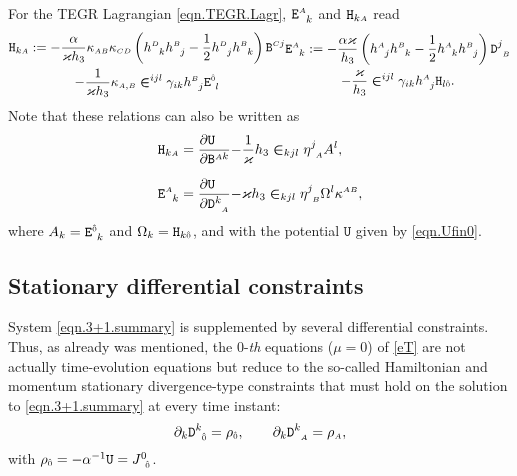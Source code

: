 \documentclass[
10pt, %
a4paper, %
oneside, %
twocolumn,
headinclude,footinclude, %
BCOR5mm, %
]{scrartcl}
\newcommand{\sA}{\mathsmaller A}
\newcommand{\sB}{\mathsmaller B}
\newcommand{\sC}{\mathsmaller C}
\newcommand{\sD}{\mathsmaller D}
\newcommand{\pd}[1]{\partial_{#1}}
\newcommand{\mg}[1]{\kappa_{#1}}			%
\newcommand{\MG}[1]{\kappa^{#1}}			%
\newcommand{\tetrsymbol}{h}
\newcommand{\itetrsymbol}{\eta}
\newcommand{\itetr}[2]{\itetrsymbol^{#1}_{\phantom{#1}#2}}
\newcommand{\tetr}[2]{\tetrsymbol^{#1}_{\phantom{#1}#2}}
\newcommand{\detTetr}{\tetrsymbol}
\newcommand{\Dfin}[2]{\mathtt{D}_{\phantom{#2}#1}^{#2}}	%
\newcommand{\Hfin}[2]{\mathtt{H}_{#2#1}}	%
\newcommand{\Efin}[2]{\mathtt{E}^{#1}_{\phantom{#1}#2}}	%
\newcommand{\Ufin}{\mathtt{U}}
\newcommand{\Bfin}[2]{\mathtt{B}^{#1#2}}	%
\newcommand{\LCsymb}{\bm{\in}}    %
\newcommand{\NC}[2]{J^{#2}_{\phantom{#2}#1}}
\newcommand{\indalg}[1]{\hat{\mathsmaller{#1}}}
\begin{document}
	For the TEGR Lagrangian \eqref{eqn.TEGR.Lagr}, $ \Efin{\sA}{k} $ and $ \Hfin{\sA}{k} $ read
	\begin{subequations}\label{eqn.H.E}
		\begin{multline}
			\Hfin{\sA}{k} := %
			-\frac{\alpha}{\varkappa \detTetr_3} 
			\mg{\sA\sB}\mg{\sC\sD} 
			\left( \tetr{\sD}{k} \tetr{\sB}{j}
			- \frac12 \tetr{\sD}{j} \tetr{\sB}{k} \right) 
			\Bfin{\sC}{j}
			\\
			- 
					\frac{1}{\varkappa \detTetr_3} \mg{\sA,\sB} \LCsymb^{ijl} \gamma_{ik} 
			\tetr{\sB}{j} 
					\Efin{\indalg{0}}{l}
		\end{multline}
		\begin{multline}
			\Efin{\sA}{k} := %
			-\frac{\alpha \varkappa}{\detTetr_3} 
			\left( \tetr{\sA}{j} \tetr{\sB}{k} - \frac12 \tetr{\sA}{k} \tetr{\sB}{j} \right) 
			\Dfin{\sB}{j} 
			\\
			- 
					\frac{\varkappa}{\detTetr_3} \LCsymb^{ijl} 
					\gamma_{ik} \tetr{\sA}{j} \Hfin{\indalg{0}}{l}.
			\label{eqn.E}
		\end{multline}
	\end{subequations}
	Note that these relations can also be written as
	\begin{align}\label{eqn.H.E.split}
		\Hfin{\sA}{k} &= %
		\frac{\pd{}\Ufin\hfill}{\pd{}\Bfin{\sA}{k}}
		{ 
			-
			\frac{1}{\varkappa}\detTetr_3 \LCsymb_{kjl} \itetr{j}{\sA} A^l},
		\\[2mm]
		\Efin{\sA}{k} &= %
		\frac{\pd{}\Ufin\hfill}{\pd{}\Dfin{\sA}{k}}
		{
			-
			\varkappa \detTetr_3 \LCsymb_{kjl} 
			\itetr{j}{\sB} \Omega^l}\MG{\sA\sB},
	\end{align}
	where $ A_k = \Efin{\indalg{0}}{k} $ and $ \Omega_k =\Hfin{\indalg{0}}{k}$, and with the potential $ \Ufin $ given by \eqref{eqn.Ufin0}.
	
	
	
	\subsection{Stationary differential constraints}
	
	System \eqref{eqn.3+1.summary} is supplemented by several differential constraints. Thus, as 
	already was mentioned, the $ 0 $-\textit{th} equations ($ \mu=0 $) of \eqref{eT} are not 
	actually 
	time-evolution equations 
	but 
	reduce to the so-called Hamiltonian and momentum stationary divergence-type constraints that 
	must 
	hold on the 
	solution to \eqref{eqn.3+1.summary} at every time instant:
	\begin{equation}\label{eqn.div.constrD}
		\pd{k} \Dfin{\indalg{0}}{k} = \rho_{\indalg{0}},
		\qquad
		\pd{k} \Dfin{\sA}{k} = \rho_{\sA}, 
	\end{equation}
	with $ \rho_{\indalg{0}} = -\alpha^{-1} \Ufin = \NC{\indalg{0}}{0} $.
	
\end{document}
